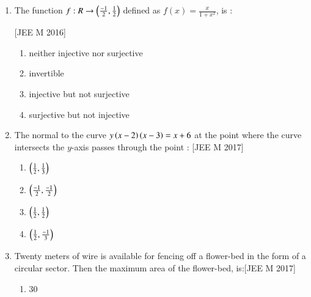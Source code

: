 \documentclass[journal,12pt,twocolumn]{IEEEtran}
\theoremstyle{remark}
\begin{document}
\begin{enumerate}
\hfill[JEE M 2016]\\
\begin{enumerate}
    \item  $x=2r$\\
    \item  $2x=r$\\
    \item  $2x=\brak{\pi+4r}$\\
    \item  $\brak{4-\pi}x=\pi r$\\
\end{enumerate}
\item The function $f : R\rightarrow {\ensuremath{\left(\frac{-1}{2}, \frac{1}{2}\right)}}$ defined as $f(x)=\frac{x}{1+x^2}$, is :

\hfill[JEE M 2016]\\
\begin{enumerate}
    \item  neither injective nor surjective\\
    \item  invertible\\
    \item  injective but not surjective\\
    \item  surjective but not injective\\
\end{enumerate}
\item The normal to the curve $y\left(x-2\right)\left(x-3\right)=x+6$ at the point where the curve intersects the $y$-axis passes through the point : \hfill[JEE M 2017]
\begin{enumerate}
    \item  $\left(\frac{1}{2}, \frac{1}{3}\right)$\\
    \item  $\left(\frac{-1}{2}, \frac{-1}{2}\right)$\\
    \item  $\left(\frac{1}{2}, \frac{1}{2}\right)$\\
    \item  $\left(\frac{1}{2}, \frac{-1}{3}\right)$\\
\end{enumerate}
\item Twenty meters of wire is available for fencing off a flower-bed in the form of a circular sector. Then the maximum area of the flower-bed, is:\hfill[JEE M 2017]\\
\begin{enumerate}
    \item  30\\

\end{enumerate}
\end{enumerate}
\end{document}
